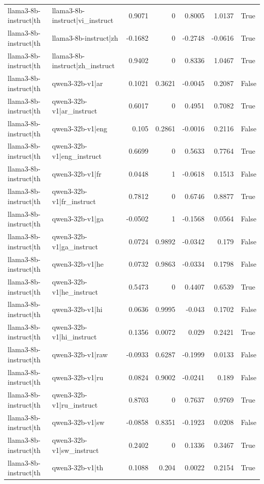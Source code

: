 \begin{table}
\begin{tabular}{l l r r r r l}
llama3-8b-instruct|th & llama3-8b-instruct|vi_instruct & 0.9071 & 0 & 0.8005 & 1.0137 & True \\
llama3-8b-instruct|th & llama3-8b-instruct|zh & -0.1682 & 0 & -0.2748 & -0.0616 & True \\
llama3-8b-instruct|th & llama3-8b-instruct|zh_instruct & 0.9402 & 0 & 0.8336 & 1.0467 & True \\
llama3-8b-instruct|th & qwen3-32b-v1|ar & 0.1021 & 0.3621 & -0.0045 & 0.2087 & False \\
llama3-8b-instruct|th & qwen3-32b-v1|ar_instruct & 0.6017 & 0 & 0.4951 & 0.7082 & True \\
llama3-8b-instruct|th & qwen3-32b-v1|eng & 0.105 & 0.2861 & -0.0016 & 0.2116 & False \\
llama3-8b-instruct|th & qwen3-32b-v1|eng_instruct & 0.6699 & 0 & 0.5633 & 0.7764 & True \\
llama3-8b-instruct|th & qwen3-32b-v1|fr & 0.0448 & 1 & -0.0618 & 0.1513 & False \\
llama3-8b-instruct|th & qwen3-32b-v1|fr_instruct & 0.7812 & 0 & 0.6746 & 0.8877 & True \\
llama3-8b-instruct|th & qwen3-32b-v1|ga & -0.0502 & 1 & -0.1568 & 0.0564 & False \\
llama3-8b-instruct|th & qwen3-32b-v1|ga_instruct & 0.0724 & 0.9892 & -0.0342 & 0.179 & False \\
llama3-8b-instruct|th & qwen3-32b-v1|he & 0.0732 & 0.9863 & -0.0334 & 0.1798 & False \\
llama3-8b-instruct|th & qwen3-32b-v1|he_instruct & 0.5473 & 0 & 0.4407 & 0.6539 & True \\
llama3-8b-instruct|th & qwen3-32b-v1|hi & 0.0636 & 0.9995 & -0.043 & 0.1702 & False \\
llama3-8b-instruct|th & qwen3-32b-v1|hi_instruct & 0.1356 & 0.0072 & 0.029 & 0.2421 & True \\
llama3-8b-instruct|th & qwen3-32b-v1|raw & -0.0933 & 0.6287 & -0.1999 & 0.0133 & False \\
llama3-8b-instruct|th & qwen3-32b-v1|ru & 0.0824 & 0.9002 & -0.0241 & 0.189 & False \\
llama3-8b-instruct|th & qwen3-32b-v1|ru_instruct & 0.8703 & 0 & 0.7637 & 0.9769 & True \\
llama3-8b-instruct|th & qwen3-32b-v1|sw & -0.0858 & 0.8351 & -0.1923 & 0.0208 & False \\
llama3-8b-instruct|th & qwen3-32b-v1|sw_instruct & 0.2402 & 0 & 0.1336 & 0.3467 & True \\
llama3-8b-instruct|th & qwen3-32b-v1|th & 0.1088 & 0.204 & 0.0022 & 0.2154 & True \\

\end{tabular}
\end{table}
